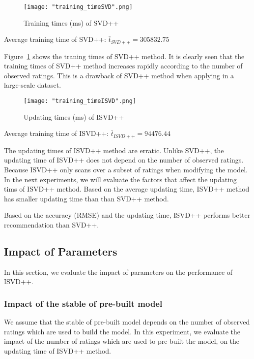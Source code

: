 \documentclass[oneside,13pt]{extreport}
\begin{document}
\clearpage

\begin{figure}[h!]
    \centering
    \texttt{[image: "training\_timeSVD".png]} 
    \caption{Training times (ms) of SVD++}
    \label{fig:train_timeSVD++}
\end{figure}

Average training time of SVD++: $\bar t_{SVD++} = 305832.75$

Figure~\ref{fig:train_timeSVD++} shows the traning times of SVD++ method. It is clearly seen that the training times of SVD++ method increases rapidly according to the number of observed ratings. This is a drawback of SVD++ method when applying in a large-scale dataset. 
\clearpage
\begin{figure}[h!]
    \centering
    \texttt{[image: "training\_timeISVD".png]} 
    \caption{Updating times (ms) of ISVD++}
    \label{fig:train_timeISVD++}
\end{figure}
Average training time of ISVD++: $\bar t_{ISVD++} =94476.44$

The updating times of ISVD++ method are erratic. Unlike SVD++, the updating time of ISVD++ does not depend on the number of observed ratings. Because ISVD++ only scans over a subset of ratings when modifying the model.
In the next experiments, we will evaluate the factors that affect the updating tims of ISVD++ method. Based on the average updating time, ISVD++ method has smaller updating time than than SVD++ method.

Based on the accuracy (RMSE) and the updating time, ISVD++ performs better recommendation than SVD++.
\subsection{Impact of Parameters}
\label{Impact of Parameters}
In this section, we evaluate the impact of parameters on the performance of ISVD++.
\subsubsection{Impact of the stable of pre-built model}
We assume that the stable of pre-built model depends on the number of observed ratings which are used to build the model. In this experiment, we evaluate the impact of the number of ratings which are used to pre-built the model, on the updating time of ISVD++ method.
\end{document}
